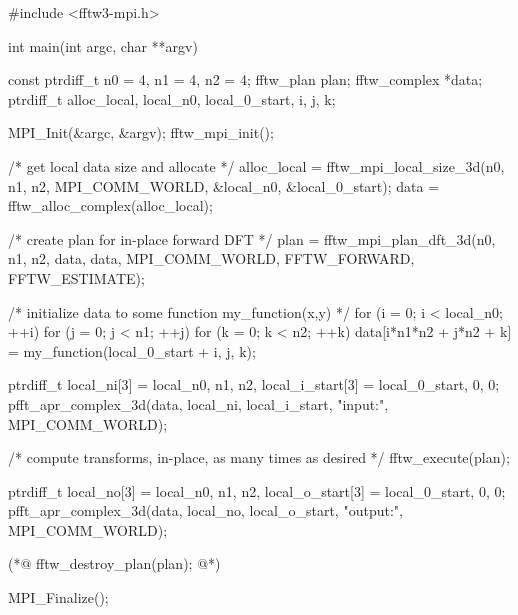 #include <fftw3-mpi.h>

int main(int argc, char **argv)
{
    const ptrdiff_t n0 = 4, n1 = 4, n2 = 4;
    fftw_plan plan;
    fftw_complex *data;
    ptrdiff_t alloc_local, local_n0, local_0_start, i, j, k;

    MPI_Init(&argc, &argv);
    fftw_mpi_init();

    /* get local data size and allocate */
    alloc_local = fftw_mpi_local_size_3d(n0, n1, n2, MPI_COMM_WORLD,
					 &local_n0, &local_0_start);
    data = fftw_alloc_complex(alloc_local);

    /* create plan for in-place forward DFT */
    plan = fftw_mpi_plan_dft_3d(n0, n1, n2, data, data, MPI_COMM_WORLD,
				FFTW_FORWARD, FFTW_ESTIMATE);

    /* initialize data to some function my_function(x,y) */
    for (i = 0; i < local_n0; ++i) 
      for (j = 0; j < n1; ++j) 
        for (k = 0; k < n2; ++k)
          data[i*n1*n2 + j*n2 + k] = my_function(local_0_start + i, j, k);

    ptrdiff_t local_ni[3] = {local_n0, n1, n2}, local_i_start[3] = {local_0_start, 0, 0};
    pfft_apr_complex_3d(data, local_ni, local_i_start, "input:", MPI_COMM_WORLD);

    /* compute transforms, in-place, as many times as desired */
    fftw_execute(plan);

    ptrdiff_t local_no[3] = {local_n0, n1, n2}, local_o_start[3] = {local_0_start, 0, 0};
    pfft_apr_complex_3d(data, local_no, local_o_start, "output:", MPI_COMM_WORLD);

(*@\color{red}
    fftw\_destroy\_plan(plan);
@*)

    MPI_Finalize();
}
